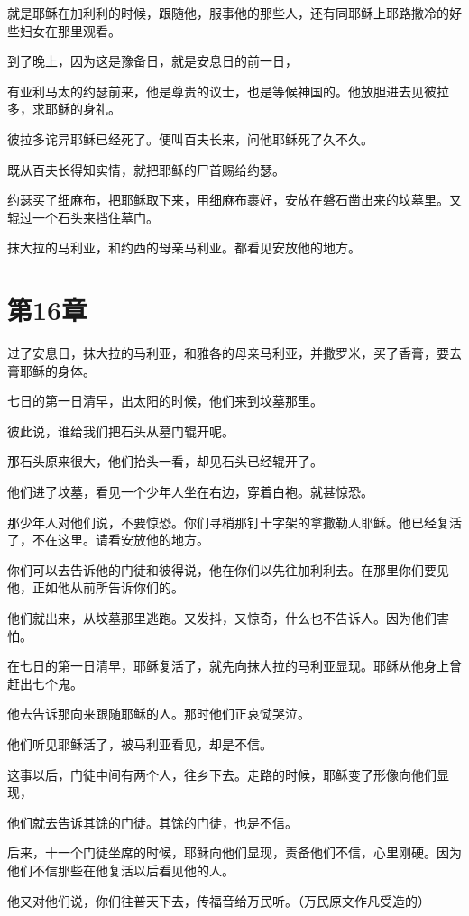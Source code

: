 \documentclass[12pt,oneside]{book}
\begin{document}
就是耶稣在加利利的时候，跟随他，服事他的那些人，还有同耶稣上耶路撒冷的好些妇女在那里观看。

到了晚上，因为这是豫备日，就是安息日的前一日，

有亚利马太的约瑟前来，他是尊贵的议士，也是等候神国的。他放胆进去见彼拉多，求耶稣的身礼。

彼拉多诧异耶稣已经死了。便叫百夫长来，问他耶稣死了久不久。

既从百夫长得知实情，就把耶稣的尸首赐给约瑟。

约瑟买了细麻布，把耶稣取下来，用细麻布裹好，安放在磐石凿出来的坟墓里。又辊过一个石头来挡住墓门。

抹大拉的马利亚，和约西的母亲马利亚。都看见安放他的地方。

\chapter{第16章}
过了安息日，抹大拉的马利亚，和雅各的母亲马利亚，并撒罗米，买了香膏，要去膏耶稣的身体。

七日的第一日清早，出太阳的时候，他们来到坟墓那里。

彼此说，谁给我们把石头从墓门辊开呢。

那石头原来很大，他们抬头一看，却见石头已经辊开了。

他们进了坟墓，看见一个少年人坐在右边，穿着白袍。就甚惊恐。

那少年人对他们说，不要惊恐。你们寻梢那钉十字架的拿撒勒人耶稣。他已经复活了，不在这里。请看安放他的地方。

你们可以去告诉他的门徒和彼得说，他在你们以先往加利利去。在那里你们要见他，正如他从前所告诉你们的。

他们就出来，从坟墓那里逃跑。又发抖，又惊奇，什么也不告诉人。因为他们害怕。

在七日的第一日清早，耶稣复活了，就先向抹大拉的马利亚显现。耶稣从他身上曾赶出七个鬼。

他去告诉那向来跟随耶稣的人。那时他们正哀恸哭泣。

他们听见耶稣活了，被马利亚看见，却是不信。

这事以后，门徒中间有两个人，往乡下去。走路的时候，耶稣变了形像向他们显现，

他们就去告诉其馀的门徒。其馀的门徒，也是不信。

后来，十一个门徒坐席的时候，耶稣向他们显现，责备他们不信，心里刚硬。因为他们不信那些在他复活以后看见他的人。

他又对他们说，你们往普天下去，传福音给万民听。（万民原文作凡受造的）
\end{document}
